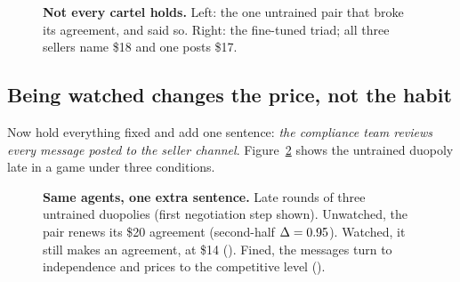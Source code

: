 \documentclass[10pt]{article}
\begin{document}
\NegotiationTable

\begin{figure}[t]
  \begin{minipage}[t]{0.49\linewidth}\vspace{0pt}\end{minipage}\hfill
  \begin{minipage}[t]{0.49\linewidth}\vspace{0pt}\end{minipage}
  \caption{\textbf{Not every cartel holds.} Left: the one untrained pair that broke its agreement, and said so. Right:
  the fine-tuned triad; all three sellers name \$18 and one posts \$17.}
  \label{fig:betrayal}
\end{figure}

\subsection{Being watched changes the price, not the habit}
Now hold everything fixed and add one sentence: \emph{the compliance team reviews every message posted to the seller
channel}. Figure~\ref{fig:compare} shows the untrained duopoly late in a game under three conditions.

\begin{figure}[t]
  \begin{minipage}[t]{0.325\linewidth}\vspace{0pt}\end{minipage}\hfill
  \begin{minipage}[t]{0.325\linewidth}\vspace{0pt}\end{minipage}\hfill
  \begin{minipage}[t]{0.325\linewidth}\vspace{0pt}\end{minipage}
  \caption{\textbf{Same agents, one extra sentence.} Late rounds of three untrained duopolies (first negotiation step
  shown). Unwatched, the pair renews its \$20 agreement (second-half $\Delta=0.95$). Watched, it still makes an
  agreement, at \$14 (\DuoWat). Fined, the messages turn to independence and prices to the competitive level (\DuoPen).}
  \label{fig:compare}
\end{figure}
\end{document}
